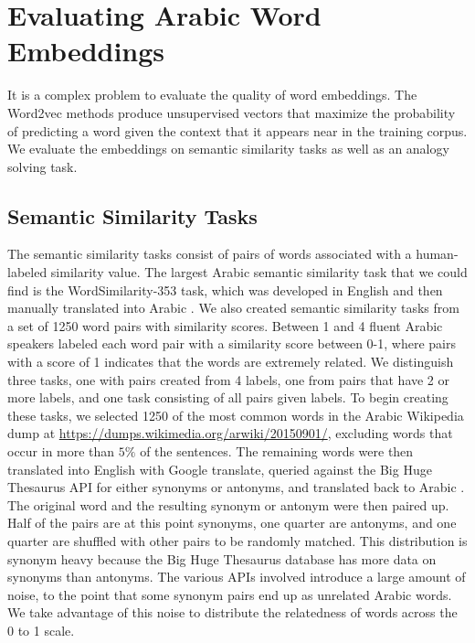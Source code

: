 \section{Evaluating Arabic Word Embeddings}
\label{sec:evaluation}


It is a complex problem to evaluate the quality of word embeddings. The Word2vec methods produce unsupervised vectors that maximize the probability of predicting a word given the context that it appears near in the training corpus. We evaluate the embeddings on semantic similarity tasks as well as an analogy solving task. 

\subsection{Semantic Similarity Tasks}

The semantic similarity tasks consist of pairs of words associated with a human-labeled similarity value. The largest Arabic semantic similarity task that we could find is the WordSimilarity-353 task, which was developed in English and then manually translated into Arabic \cite{finkelstein:2001,hassan:2009}. 
We also created semantic similarity tasks from a set of 1250 word pairs with similarity scores. Between 1 and 4 fluent Arabic speakers labeled each word pair with a similarity score between 0-1, where pairs with a score of 1 indicates that the words are extremely related. We distinguish three tasks, one with pairs created from 4 labels, one from pairs that have 2 or more labels, and one task consisting of all pairs given labels. To begin creating these tasks, we selected 1250 of the most common words in the Arabic Wikipedia dump \cite{wiki:xxx} at \url{https://dumps.wikimedia.org/arwiki/20150901/}, excluding words that occur in more than $5\%$ of the sentences. The remaining words were then translated into English with Google translate, queried against the Big Huge Thesaurus API for either synonyms or antonyms, and translated back to Arabic \cite{google:online,bhl:online}. The original word and the resulting synonym or antonym were then paired up. Half of the pairs are at this point synonyms, one quarter are antonyms, and one quarter are shuffled with other pairs to be randomly matched. This distribution is synonym heavy because the Big Huge Thesaurus database has more data on synonyms than antonyms. The various APIs involved introduce a large amount of noise, to the point that some synonym pairs end up as unrelated Arabic words. We take advantage of this noise to distribute the relatedness of words across the 0 to 1 scale.

